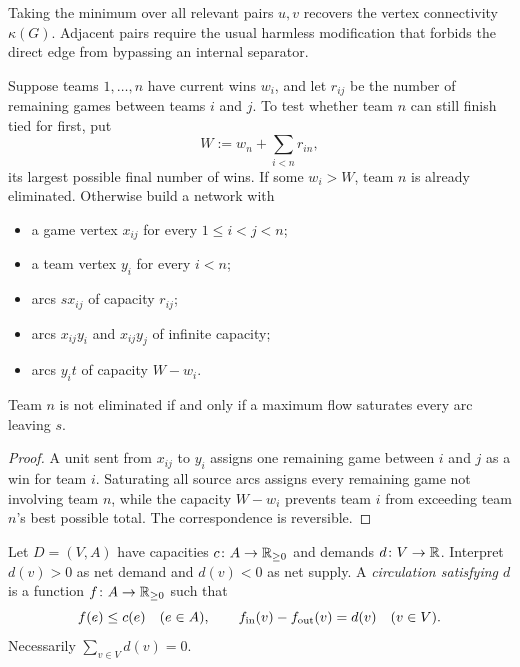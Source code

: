 \begin{noteremark}
Taking the minimum over all relevant pairs $u,v$ recovers the vertex
connectivity $\kappa(G)$.  Adjacent pairs require the usual harmless
modification that forbids the direct edge from bypassing an internal
separator.
\end{noteremark}
\begin{noteapplication}
Suppose teams $1,\dots,n$ have current wins $w_i$, and let $r_{ij}$ be the
number of remaining games between teams $i$ and $j$.  To test whether team
$n$ can still finish tied for first, put
\[
  W:=w_n+\sum_{i<n}r_{in},
\]
its largest possible final number of wins.  If some $w_i>W$, team $n$ is
already eliminated.  Otherwise build a network with
\begin{itemize}
  \item a game vertex $x_{ij}$ for every $1\le i<j<n$;
  \item a team vertex $y_i$ for every $i<n$;
  \item arcs $s x_{ij}$ of capacity $r_{ij}$;
  \item arcs $x_{ij}y_i$ and $x_{ij}y_j$ of infinite capacity;
  \item arcs $y_i t$ of capacity $W-w_i$.
\end{itemize}
Team $n$ is not eliminated if and only if a maximum flow saturates every arc
leaving $s$.
\end{noteapplication}
\begin{proof}
A unit sent from $x_{ij}$ to $y_i$ assigns one remaining game between $i$ and
$j$ as a win for team $i$.  Saturating all source arcs assigns every remaining
game not involving team $n$, while the capacity $W-w_i$ prevents team $i$
from exceeding team $n$'s best possible total.  The correspondence is
reversible.
\end{proof}
\begin{notedefinition}
Let $D=(V,A)$ have capacities $c\colon A\to\mathbb{R}_{\ge0}$ and demands
$d\colon V\to\mathbb{R}$.  Interpret $d(v)>0$ as net demand and $d(v)<0$ as net
supply.  A \emph{circulation satisfying $d$} is a function
$f\colon A\to\mathbb{R}_{\ge0}$ such that
\[
  f(e)\le c(e)\quad(e\in A),
  \qquad
  f_{\operatorname{in}}(v)-f_{\operatorname{out}}(v)=d(v)\quad(v\in V).
\]
Necessarily $\sum_{v\in V}d(v)=0$.
\end{notedefinition}


